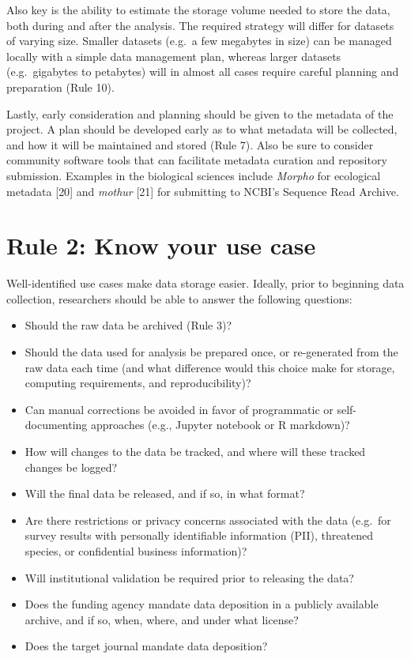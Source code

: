 \documentclass[10pt,letterpaper]{article}
\providecommand{\tightlist}{%
  \setlength{\itemsep}{0pt}\setlength{\parskip}{0pt}
}
\begin{document}
Also key is the ability to estimate the storage volume needed to store
the data, both during and after the analysis. The required strategy will
differ for datasets of varying size. Smaller datasets (e.g.~a few
megabytes in size) can be managed locally with a simple data management
plan, whereas larger datasets (e.g.~gigabytes to petabytes) will in
almost all cases require careful planning and preparation (Rule 10).

Lastly, early consideration and planning should be given to the metadata
of the project. A plan should be developed early as to what metadata
will be collected, and how it will be maintained and stored (Rule 7).
Also be sure to consider community software tools that can facilitate
metadata curation and repository submission. Examples in the biological
sciences include \emph{Morpho} for ecological metadata {[}20{]} and
\emph{mothur} {[}21{]} for submitting to NCBI's Sequence Read Archive.

\section*{Rule 2: Know your use case}\label{rule-2-know-your-use-case}

Well-identified use cases make data storage easier. Ideally, prior to
beginning data collection, researchers should be able to answer the
following questions:

\begin{itemize}
\tightlist
\item
  Should the raw data be archived (Rule 3)?
\item
  Should the data used for analysis be prepared once, or re-generated
  from the raw data each time (and what difference would this choice
  make for storage, computing requirements, and reproducibility)?
\item
  Can manual corrections be avoided in favor of programmatic or
  self-documenting approaches (e.g., Jupyter notebook or R markdown)?
\item
  How will changes to the data be tracked, and where will these tracked
  changes be logged?
\item
  Will the final data be released, and if so, in what format?
\item
  Are there restrictions or privacy concerns associated with the data
  (e.g.~for survey results with personally identifiable information
  (PII), threatened species, or confidential business information)?
\item
  Will institutional validation be required prior to releasing the data?
\item
  Does the funding agency mandate data deposition in a publicly
  available archive, and if so, when, where, and under what license?
\item
  Does the target journal mandate data deposition?
\end{itemize}
\end{document}

